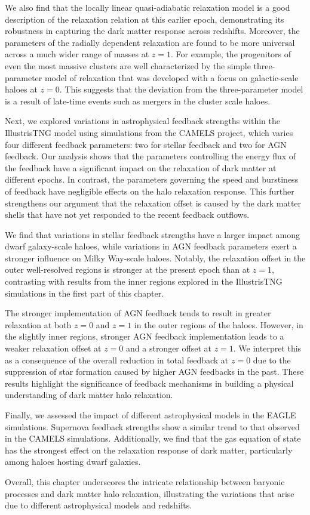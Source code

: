 We also find that the locally linear quasi-adiabatic relaxation model is a good description of the relaxation relation at this earlier epoch, demonstrating its robustness in capturing the dark matter response across redshifts. Moreover, the parameters of the radially dependent relaxation are found to be more universal across a much wider range of masses at \( z=1 \). For example, the progenitors of even the most massive clusters are well characterized by the simple three-parameter model of relaxation that was developed with a focus on galactic-scale haloes at \( z=0 \). This suggests that the deviation from the three-parameter model is a result of late-time events such as mergers in the cluster scale haloes.%

Next, we explored variations in astrophysical feedback strengths within the IllustrisTNG model using simulations from the CAMELS project, which varies four different feedback parameters: two for stellar feedback and two for AGN feedback. Our analysis shows that the parameters controlling the energy flux of the feedback have a significant impact on the relaxation of dark matter at different epochs. In contrast, the parameters governing the speed and burstiness of feedback have negligible effects on the halo relaxation response. This further strengthens our argument that the relaxation offset is caused by the dark matter shells that have not yet responded to the recent feedback outflows. %

We find that variations in stellar feedback strengths have a larger impact among dwarf galaxy-scale haloes, while variations in AGN feedback parameters exert a stronger influence on Milky Way-scale haloes. Notably, the relaxation offset in the outer well-resolved regions is stronger at the present epoch than at \( z=1 \), contrasting with results from the inner regions explored in the IllustrisTNG simulations in the first part of this chapter.

The stronger implementation of AGN feedback tends to result in greater relaxation at both \( z=0 \) and \( z=1 \) in the outer regions of the haloes. However, in the slightly inner regions, stronger AGN feedback implementation leads to a weaker relaxation offset at \( z=0 \) and a stronger offset at \( z=1 \). We interpret this as a consequence of the overall reduction in total feedback at \( z=0 \) due to the suppression of star formation caused by higher AGN feedbacks in the past. These results highlight the significance of feedback mechanisms in building a physical understanding of dark matter halo relaxation.

Finally, we assessed the impact of different astrophysical models in the EAGLE simulations. Supernova feedback strengths show a similar trend to that observed in the CAMELS simulations. Additionally, we find that the gas equation of state has the strongest effect on the relaxation response of dark matter, particularly among haloes hosting dwarf galaxies.

Overall, this chapter underscores the intricate relationship between baryonic processes and dark matter halo relaxation, illustrating the variations that arise due to different astrophysical models and redshifts.